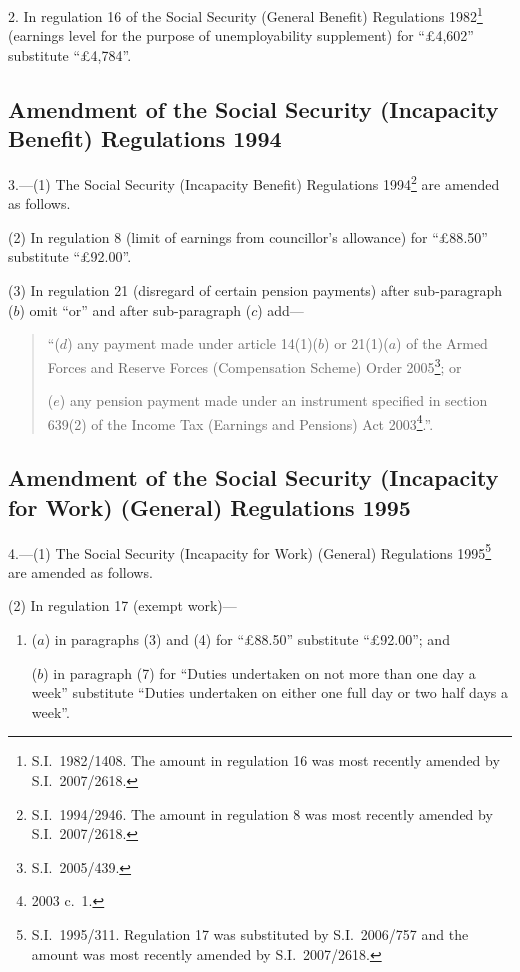 \documentclass[12pt,a4paper]{article}
\begin{document}
2.  In regulation 16 of the Social Security (General Benefit) Regulations 1982\footnote{S.I.~1982/1408. The amount in regulation 16 was most recently amended by S.I.~2007/2618.} (earnings level for the purpose of unemployability supplement) for “£4,602” substitute “£4,784”.

\subsection[3. Amendment of the Social Security (Incapacity Benefit) Regulations 1994]{Amendment of the Social Security (Incapacity Benefit) Regulations 1994}

\begin{sloppypar}
3.---(1)  The Social Security (Incapacity Benefit) Regulations 1994\footnote{S.I.~1994/2946. The amount in regulation 8 was most recently amended by S.I.~2007/2618.} are amended as follows.
\end{sloppypar}

(2) In regulation 8 (limit of earnings from councillor’s allowance) for “£88$.$50” substitute “£92$.$00”.

(3) In regulation 21 (disregard of certain pension payments) after sub-paragraph ($b$)  omit “or” and after sub-paragraph ($c$)  add—
\begin{quotation}
“($d$) any payment made under article 14(1)($b$)  or 21(1)($a$)  of the Armed Forces and Reserve Forces (Compensation Scheme) Order 2005\footnote{S.I.~2005/439.}; or

($e$) any pension payment made under an instrument specified in section 639(2) of the Income Tax (Earnings and Pensions) Act 2003\footnote{2003 c.~1.}.”.
\end{quotation}

\subsection[4. Amendment of the Social Security (Incapacity for Work) (General) Regulations 1995]{\sloppy{} Amendment of the Social Security (Incapacity for Work) (General) Regulations 1995}

4.---(1)  The Social Security (Incapacity for Work) (General) Regulations 1995\footnote{S.I.~1995/311. Regulation 17 was substituted by S.I.~2006/757 and the amount was most recently amended by S.I.~2007/2618.} are amended as follows.

(2) In regulation 17 (exempt work)—
\begin{enumerate}\item[]
($a$) in paragraphs (3) and (4) for “£88$.$50” substitute “£92$.$00”; and

($b$) in paragraph (7) for “Duties undertaken on not more than one day a week” substitute “Duties undertaken on either one full day or two half days a week”.
\end{enumerate}
\end{document}
